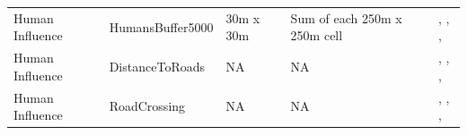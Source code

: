 \documentclass[abstract=on,10pt,a4paper,bibliography=totocnumbered]{scrartcl}
\begin{document}
\begin{table}[h]
\begin{center}
{\begin{tabular}{llp{4cm}p{4cm}p{7cm}}
      \hdashline
      Human Influence
        & HumansBuffer5000
          & 30m x 30m
            & Sum of each 250m x 250m cell
              & \cite{Facebook.2019}, \cite{OpenStreetMap.2019}, \cite{Chen.2015}, \cite{Xiong.2017}\\
      Human Influence
        & DistanceToRoads
          & NA
            & NA
              & \cite{Facebook.2019}, \cite{OpenStreetMap.2019}, \cite{Chen.2015}, \cite{Xiong.2017}\\
      Human Influence
        & RoadCrossing
          & NA
            & NA
              & \cite{Facebook.2019}, \cite{OpenStreetMap.2019}, \cite{Chen.2015}, \cite{Xiong.2017}\\
      \hline
      \end{tabular}
    }
  \end{center}
\end{table}


\newpage
\end{document}
